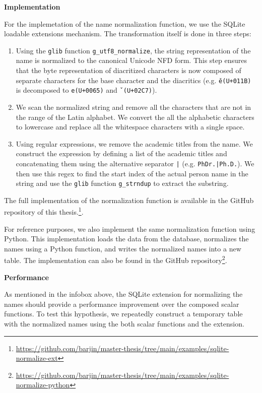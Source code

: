 \textbf{Implementation}

For the implemetation of the name normalization function, we use the SQLite loadable extensions mechanism.
The transformation itself is done in three steps:

\begin{enumerate}
    \item Using the \texttt{glib} function \texttt{g\_utf8\_normalize}, the string representation of the name is normalized to the canonical Unicode NFD form.
    This step ensures that the byte representation of diacritized characters is now composed of separate characters for the base character and the diacritics (e.g. \texttt{ě}\texttt{(U+011B)} is decomposed to \texttt{e}\texttt{(U+0065)} and \texttt{ˇ}\texttt{(U+02C7)}).
    \item We scan the normalized string and remove all the characters that are not in the range of the Latin alphabet. We convert the all the 
    alphabetic characters to lowercase and replace all the whitespace characters with a single space.
    \item Using regular expressions, we remove the academic titles from the name. 
    We construct the expression by defining a list of the academic titles and concatenating them using the alternative separator \texttt{|} (e.g. \texttt{PhDr.|Ph.D.}).
    We then use this regex to find the start index of the actual person name in the string
    and use the \texttt{glib} function \texttt{g\_strndup} to extract the substring.
\end{enumerate}

The full implementation of the normalization function is available in the GitHub repository of this thesis.\footnote{\url{https://github.com/barjin/master-thesis/tree/main/examples/sqlite-normalize-ext}}.

For reference purposes, we also implement the same normalization function using Python.
This implementation loads the data from the database, normalizes the names using a Python function, and writes the normalized names into a new table.
The implementation can also be found in the GitHub repository\footnote{\url{https://github.com/barjin/master-thesis/tree/main/examples/sqlite-normalize-python}}.

\textbf{Performance}

As mentioned in the infobox above, the SQLite extension for normalizing the names should provide a performance improvement over the composed scalar functions.
To test this hypothesis, we repeatedly construct a temporary table with the normalized names using the both scalar functions and the extension.

